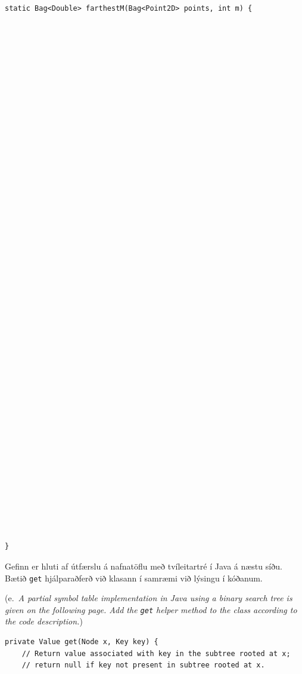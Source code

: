 \documentclass[addpoints]{exam}
\newcommand{\eng}[1]{(e.\ \emph{#1})}
\begin{document}
\begin{questions}
\begin{verbatim}
static Bag<Double> farthestM(Bag<Point2D> points, int m) {













































}
\end{verbatim}

\newpage
\question[4] Gefinn er hluti af útfærslu á nafnatöflu með tvíleitartré í Java á næstu síðu. Bætið \texttt{get} hjálparaðferð við klasann í samræmi við lýsingu í kóðanum. 

\eng{A partial symbol table implementation in Java using a binary search tree is given on the following page. Add the \texttt{get} helper method to the class according to the code description.}

\begin{verbatim}
private Value get(Node x, Key key) {
    // Return value associated with key in the subtree rooted at x;
    // return null if key not present in subtree rooted at x.














































\end{verbatim}
\end{questions}
\end{document}
